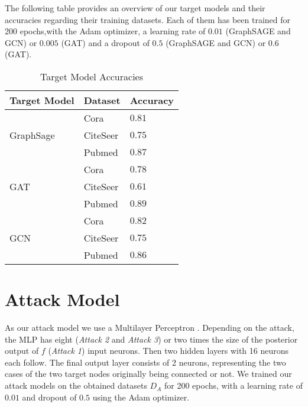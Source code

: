     The following table provides an overview of our target models and their accuracies regarding their training datasets.
    Each of them has been trained for 200 epochs,with the Adam optimizer, a learning rate of $0.01$ (GraphSAGE and GCN) or $0.005$ (GAT) and a dropout of $0.5$ (GraphSAGE and GCN) or $0.6$ (GAT). 
    \vspace{0.48cm}
    \begin{table}[!h]
      \centering
      \footnotesize
      \begin{tabular}{l|l|l|}
        \toprule
        Target Model & Dataset & Accuracy \\
        \midrule
          \multirow{3}{4em}{GraphSage} & Cora & $0.81$ \\
          & CiteSeer & $0.75$ \\
          & Pubmed & $0.87$ \\

          \multirow{3}{4em}{GAT} & Cora & $0.78$ \\
          & CiteSeer & $0.61$ \\
          & Pubmed & $0.89$ \\

          \multirow{3}{4em}{GCN} & Cora & $0.82$ \\
          & CiteSeer & $0.75$ \\
          & Pubmed & $0.86$ \\
          
        \bottomrule
      \end{tabular}
      \caption{Target Model Accuracies}
      \label{table:target-models}
    \end{table}

  \section{Attack Model}
    As our attack model we use a Multilayer Perceptron .
    Depending on the attack, the MLP has eight (\emph{Attack 2} and \emph{Attack 3}) or two times the size of the posterior output of $f$ (\emph{Attack 1}) input neurons.
    Then two hidden layers with 16 neurons each follow.
    The final output layer consists of 2 neurons, representing the two cases of the two target nodes originally being connected or not.
    We trained our attack models on the obtained datasets $D_A$ for 200 epochs, with a learning rate of $0.01$ and dropout of $0.5$ using the Adam optimizer.
